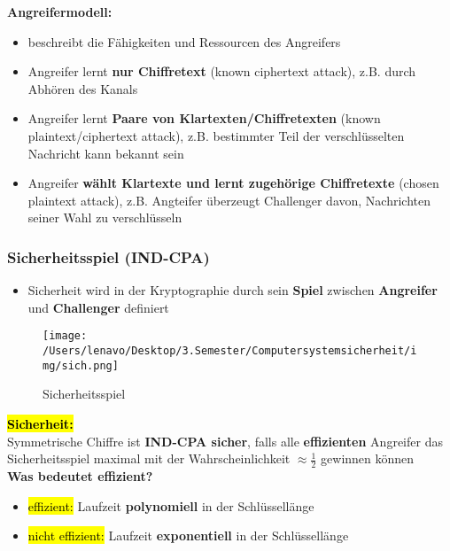 \documentclass[a4paper, 10pt]{article}
\begin{document}
\noindent\textbf{Angreifermodell:}
\begin{itemize}
    \item beschreibt die Fähigkeiten und Ressourcen des Angreifers
    \item Angreifer lernt \textbf{nur Chiffretext} (known ciphertext attack), z.B. durch Abhören des Kanals
    \item Angreifer lernt \textbf{Paare von Klartexten/Chiffretexten} (known plaintext/ciphertext attack), z.B. bestimmter Teil der verschlüsselten Nachricht kann bekannt sein
    \item Angreifer \textbf{wählt Klartexte und lernt zugehörige Chiffretexte} (chosen plaintext attack), z.B. Angteifer überzeugt Challenger davon, Nachrichten seiner Wahl zu verschlüsseln
\end{itemize}
\subsubsection{Sicherheitsspiel (IND-CPA)}
\begin{itemize}
    \item Sicherheit wird in der Kryptographie durch sein \textbf{Spiel} zwischen \textbf{Angreifer} und \textbf{Challenger} definiert
\end{itemize}
\begin{figure}[h]
    \centering
    \texttt{[image: /Users/lenavo/Desktop/3.Semester/Computersystemsicherheit/img/sich.png]}
    \caption{Sicherheitsspiel}
    \label{fig:enter-label}
\end{figure}
\textbf{\hl{Sicherheit:}}\\[2mm] Symmetrische Chiffre ist \textbf{IND-CPA sicher}, falls alle \textbf{effizienten} Angreifer das Sicherheitsspiel maximal mit der Wahrscheinlichkeit $\approx \frac{1}{2}$ gewinnen können\\[3mm]
\textbf{Was bedeutet effizient?}
\begin{itemize}
    \item \hl{effizient:} Laufzeit \textbf{polynomiell} in der Schlüssellänge
    \item \hl{nicht effizient:} Laufzeit \textbf{exponentiell} in der Schlüssellänge
\end{itemize}
\end{document}
